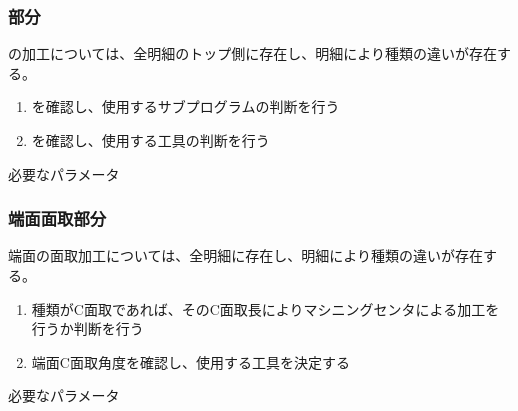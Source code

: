 \subsubsection{\Keyway 部分}
\Keyway の加工については、全明細のトップ側に存在し、明細により種類の違いが存在する。
\begin{enumerate}
\item \nameKeywayType を確認し、使用するサブプログラムの判断を行う
\item \nameKeywayWidth を確認し、使用する工具の判断を行う
\end{enumerate}
\begin{Parameter}{必要なパラメータ}
\PMKeywayType%
\PMTopOutcutExists%
\PMKeywayWidth%
\end{Parameter}

\clearpage
\subsubsection{端面面取部分}
端面の面取加工については、全明細に存在し、明細により種類の違いが存在する。
\begin{enumerate}
\item 種類がC面取であれば、そのC面取長によりマシニングセンタによる加工を行うか判断を行う
\item {}端面C面取角度を確認し、使用する工具を決定する
\end{enumerate}
\begin{Parameter}{必要なパラメータ}
\PMChamferType%
\PMCChamferLength%
\PMCChamferAngle%
\PMTopOutcutExists%
\end{Parameter}

